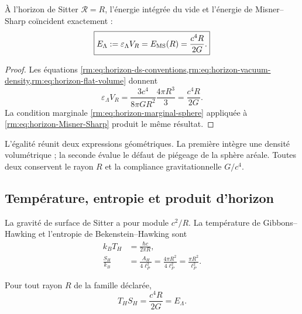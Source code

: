\begin{theorem}
\label{rm:thm:horizon-vacuum-MS}
À l’horizon de Sitter \(\mathcal R=R\), l’énergie intégrée du vide et l’énergie de Misner--Sharp coïncident exactement :
\begin{equation}
 \boxed{
 E_\Lambda
 :=\varepsilon_\Lambda V_R
 =E_{\rm MS}(R)
 =\frac{c^4R}{2G}.}
 \label{rm:eq:horizon-E-Lambda}
\end{equation}
\end{theorem}

\begin{proof}
Les équations \cref{rm:eq:horizon-ds-conventions,rm:eq:horizon-vacuum-density,rm:eq:horizon-flat-volume} donnent
\[
 \varepsilon_\Lambda V_R
 =\frac{3c^4}{8\pi GR^2}\frac{4\pi R^3}{3}
 =\frac{c^4R}{2G}.
\]
La condition marginale \cref{rm:eq:horizon-marginal-sphere} appliquée à \cref{rm:eq:horizon-Misner-Sharp} produit le même résultat.
\end{proof}

L’égalité réunit deux expressions géométriques. La première intègre une densité volumétrique ; la seconde évalue le défaut de piégeage de la sphère aréale. Toutes deux conservent le rayon \(R\) et la compliance gravitationnelle \(G/c^4\).

\subsection{Température, entropie et produit d’horizon}

La gravité de surface de Sitter a pour module \(c^2/R\). La température de Gibbons--Hawking \cite{rm:GibbonsHawking1977} et l’entropie de Bekenstein--Hawking \cite{rm:Bekenstein1973,rm:Hawking1975} sont
\begin{align}
 k_BT_H&=\frac{\hbar c}{2\pi R},
 \label{rm:eq:horizon-temperature}\\
 \frac{S_H}{k_B}
 &=\frac{A_H}{4\ell_P^2}
 =\frac{4\pi R^2}{4\ell_P^2}
 =\frac{\pi R^2}{\ell_P^2}.
 \label{rm:eq:horizon-entropy}
\end{align}

\begin{theorem}
\label{rm:thm:horizon-TS}
Pour tout rayon \(R\) de la famille déclarée,
\begin{equation}
 \boxed{
 T_HS_H=\frac{c^4R}{2G}=E_\Lambda.}
 \label{rm:eq:horizon-TS-E}
\end{equation}
\end{theorem}

